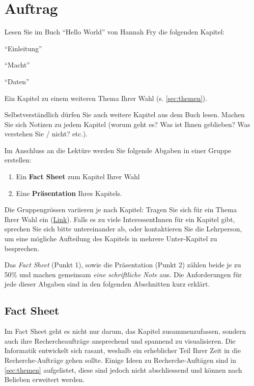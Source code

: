 \restoregeometry
\pagestyle{fancy}
\newpage
\section{Auftrag}
Lesen Sie im Buch ``Hello World'' von Hannah Fry die folgenden Kapitel:
\begin{enumerate*}
	\item ``Einleitung''
	\item ``Macht''
	\item ``Daten''
	\item Ein Kapitel zu einem weiteren Thema  Ihrer Wahl (s. \cref{sec:themen}).
\end{enumerate*}
Selbstverständlich dürfen Sie auch weitere Kapitel aus dem Buch lesen. Machen Sie sich Notizen zu jedem Kapitel (worum geht es? Was ist Ihnen geblieben? Was verstehen Sie / nicht? etc.).

Im Anschluss an die Lektüre werden Sie folgende Abgaben in einer Gruppe erstellen:

\begin{enumerate}
	\item Ein \textbf{Fact Sheet} zum Kapitel Ihrer Wahl
	\item Eine \textbf{Präsentation} Ihres Kapitels.
\end{enumerate}

Die Gruppengrössen variieren je nach Kapitel: Tragen Sie sich für ein Thema Ihrer Wahl ein (\href{https://eduzh-my.sharepoint.com/:x:/g/personal/cyril_wendl_edu_zh_ch/EScHfDarDeVHhAJB3WPCghsBYa63XpdaEkcrZk5dOiQiVA?e=kHy0bM}{Link}). Falls es zu viele InteressentInnen für ein Kapitel gibt, sprechen Sie sich bitte untereinander ab, oder kontaktieren Sie die Lehrperson, um eine mögliche Aufteilung des Kapitels in mehrere Unter-Kapitel zu besprechen.

Das \textit{Fact Sheet} (Punkt 1), sowie die Präsentation (Punkt 2) zählen beide je zu 50\% und machen gemeinsam \textit{eine schriftliche Note} aus. Die Anforderungen für jede dieser Abgaben sind in den folgenden Abschnitten kurz erklärt.

\subsection{Fact Sheet}
Im Fact Sheet geht es nicht nur darum, das Kapitel zusammenzufassen, sondern auch ihre Rechercheaufträge ansprechend und spannend zu visualisieren. Die Informatik entwickelt sich rasant, weshalb ein erheblicher Teil Ihrer Zeit in die Recherche-Aufträge gehen sollte. Einige Ideen zu Recherche-Auftägen sind in \cref{sec:themen} aufgelistet, diese sind jedoch nicht abschliessend und können nach Belieben erweitert werden.

